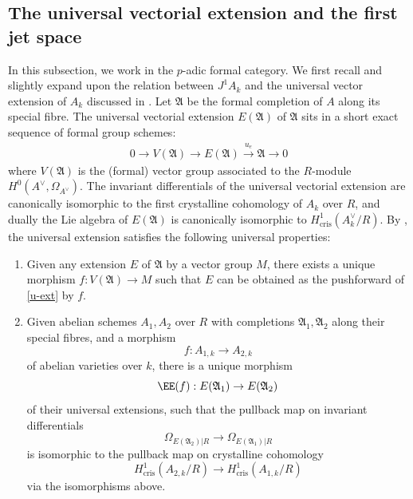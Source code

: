 \documentclass[11pt]{amsart}
\theoremstyle{plain}
\theoremstyle{definition}
\newcommand{\cris}{\mathrm{cris}}
\begin{document}
\subsection{The universal vectorial extension and the first jet space}
In this subsection, we work in the $p$-adic formal category. We first recall and slightly expand upon the relation between $J^1 A_k$ and the universal vector extension of $A_k$ discussed in \cite[\S 5]{pandit:26}. Let $\mathfrak{A}$ be the formal completion of $A$ along its special fibre.  The universal vectorial extension $E(\mathfrak{A})$ of $\mathfrak{A}$ sits in a short exact sequence of formal group schemes:
\begin{align} \label{u-ext} 
0\longrightarrow V(\mathfrak{A}) \longrightarrow E(\mathfrak{A}) \xrightarrow{u_e} \mathfrak{A} \longrightarrow 0
\end{align}
where $V(\mathfrak{A})$ is the (formal) vector group associated to the $R$-module $H^{0}(A^{\vee}, \Omega_{A^{\vee}})$. The invariant differentials of the universal vectorial extension are canonically isomorphic to the first crystalline cohomology of $A_k$ over $R$, and dually the Lie algebra of $E(\mathfrak{A})$ is canonically isomorphic to $H^1 _{\cris }(A_k ^\vee /R)$. By \cite{MM}, the universal extension satisfies the following universal properties: 
\begin{enumerate}
\item Given any extension $E$ of $\mathfrak{A}$ by a vector group $M$, there exists a unique morphism $f: V(\mathfrak{A}) \longrightarrow M$ such that $E$ can be obtained as the pushforward of \eqref{u-ext} by $f$.
\item Given abelian schemes $A_1 ,A_2 $ over $R$ with completions $\mathfrak{A}_1 ,\mathfrak{A}_2 $ along their special fibres, and a morphism
\[
f: A_{1,k}\to A_{2,k}
\]
of abelian varieties over $k$, there is a unique morphism
\[
\EE(f): E(\mathfrak{A}_{1})\to E(\mathfrak{A}_2)
\]
of their universal extensions, such that the pullback map on invariant differentials
\[
\Omega _{E(\mathfrak{A}_2 )|R}\to \Omega _{E(\mathfrak{A}_1 )|R}
\]
is isomorphic to the pullback map on crystalline cohomology
\[
H^1 _{\cris }(A_{2,k}/R)\to H^1 _{\cris }(A_{1,k} /R) 
\]
via the isomorphisms above.
\end{enumerate}
\end{document}
